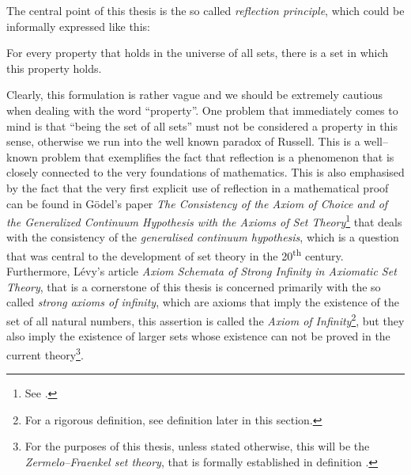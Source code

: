 The central point of this thesis is the so called \emph{reflection principle}, which could be informally expressed like this:
\begin{displayquote}
For every property that holds in the universe of all sets, there is a set in which this property holds.
\end{displayquote}

Clearly, this formulation is rather vague and we should be extremely cautious when dealing with the word ``property''. 
One problem that immediately comes to mind is that ``being the set of all sets'' must not be considered a property in this sense, otherwise we run into the well known paradox of Russell.
This is a well–known problem that exemplifies the fact that reflection is a phenomenon that is closely connected to the very foundations of mathematics.
This is also emphasised by the fact that the very first explicit use of reflection in a mathematical proof can be found in Gödel's paper \emph{The Consistency of the Axiom of Choice and of the Generalized Continuum Hypothesis with the Axioms of Set Theory}\footnote{See \cite{Godel1940consistency}.}
that deals with the consistency of the \emph{generalised continuum hypothesis}, which is a question that was central to the development of set theory in the 20\textsuperscript{th} century.
Furthermore, Lévy's article \emph{Axiom Schemata of Strong Infinity in Axiomatic Set Theory}, that is a cornerstone of this thesis is concerned primarily with the so called \emph{strong axioms of infinity}, which are axioms that imply the existence of the set of all natural numbers, this assertion is called the \emph{Axiom of Infinity}\footnote{For a rigorous definition, see definition  later in this section.}, but they also imply the existence of larger sets whose existence can not be proved in the current theory\footnote{For the purposes of this thesis, unless stated otherwise, this will be the \emph{Zermelo–Fraenkel set theory}, that is formally established in definition .}.

